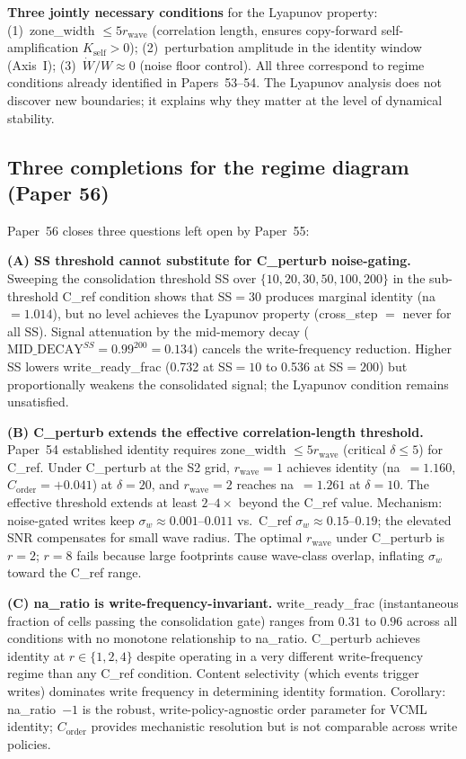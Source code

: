 \documentclass[11pt]{article}
\begin{document}
\textbf{Three jointly necessary conditions} for the Lyapunov property:
(1)~zone\_width $\leq 5r_\text{wave}$ (correlation length, ensures copy-forward
self-amplification $K_\mathrm{self} > 0$);
(2)~perturbation amplitude in the identity window (Axis~I);
(3)~$\dot{W}/W \approx 0$ (noise floor control).
All three correspond to regime conditions already identified in Papers~53--54.
The Lyapunov analysis does not discover new boundaries; it explains why they matter
at the level of dynamical stability.

\subsection{Three completions for the regime diagram (Paper 56)}

Paper~56 closes three questions left open by Paper~55:

\textbf{(A) SS threshold cannot substitute for C\_perturb noise-gating.}
Sweeping the consolidation threshold SS over $\{10, 20, 30, 50, 100, 200\}$
in the sub-threshold C\_ref condition shows that SS$=30$ produces marginal
identity (na$=1.014$), but no level achieves the Lyapunov property
(cross\_step $=$ never for all SS).
Signal attenuation by the mid-memory decay ($\mathrm{MID\_DECAY}^{SS}
= 0.99^{200} = 0.134$) cancels the write-frequency reduction.
Higher SS lowers write\_ready\_frac (0.732 at SS$=10$ to 0.536 at SS$=200$)
but proportionally weakens the consolidated signal; the Lyapunov condition
remains unsatisfied.

\textbf{(B) C\_perturb extends the effective correlation-length threshold.}
Paper~54 established identity requires zone\_width $\leq 5r_\text{wave}$
(critical $\delta \leq 5$) for C\_ref.
Under C\_perturb at the S2 grid, $r_\text{wave}=1$ achieves identity
(na~$=1.160$, $C_\text{order}=+0.041$) at $\delta=20$, and $r_\text{wave}=2$
reaches na~$=1.261$ at $\delta=10$.
The effective threshold extends at least $2$--$4\times$ beyond the C\_ref
value.
Mechanism: noise-gated writes keep $\sigma_w \approx 0.001$--$0.011$
vs.\ C\_ref $\sigma_w \approx 0.15$--$0.19$; the elevated SNR compensates for
small wave radius.
The optimal $r_\text{wave}$ under C\_perturb is $r=2$; $r=8$ fails because
large footprints cause wave-class overlap, inflating $\sigma_w$ toward the C\_ref
range.

\textbf{(C) na\_ratio is write-frequency-invariant.}
write\_ready\_frac (instantaneous fraction of cells passing the consolidation
gate) ranges from $0.31$ to $0.96$ across all conditions with no monotone
relationship to na\_ratio.
C\_perturb achieves identity at $r \in \{1,2,4\}$ despite operating in a very
different write-frequency regime than any C\_ref condition.
Content selectivity (which events trigger writes) dominates write frequency
in determining identity formation.
Corollary: na\_ratio~$-1$ is the robust, write-policy-agnostic order parameter
for VCML identity; $C_\text{order}$ provides mechanistic resolution but is not
comparable across write policies.
\end{document}

